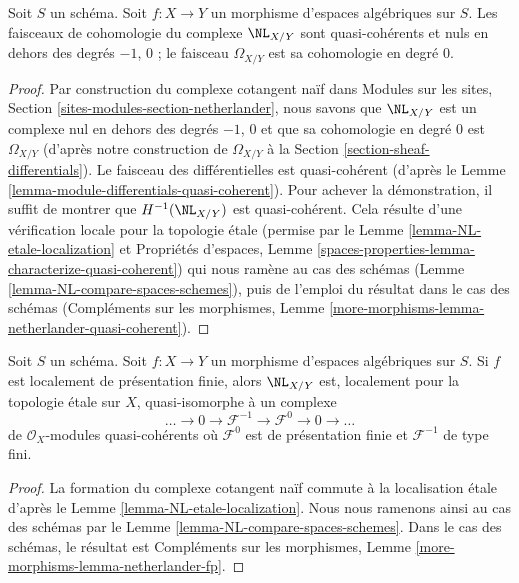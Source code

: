 \begin{lemma}
\label{lemma-netherlander-quasi-coherent}
Soit $S$ un schéma. Soit $f : X \to Y$ un morphisme
d'espaces algébriques sur $S$. Les faisceaux de cohomologie
du complexe $\NL_{X/Y}$ sont quasi-cohérents et nuls en dehors
des degrés $-1$, $0$ ; le faisceau $\Omega_{X/Y}$ est sa cohomologie en degré $0$.
\end{lemma}

\begin{proof}
Par construction du complexe cotangent naïf dans
Modules sur les sites, Section \ref{sites-modules-section-netherlander},
nous savons que $\NL_{X/Y}$ est un complexe nul en dehors des degrés $-1$, $0$
et que sa cohomologie en degré $0$ est $\Omega_{X/Y}$ (d'après notre
construction de $\Omega_{X/Y}$ à la Section \ref{section-sheaf-differentials}).
Le faisceau des différentielles est quasi-cohérent (d'après le
Lemme \ref{lemma-module-differentials-quasi-coherent}).
Pour achever la démonstration, il suffit de montrer que $H^{-1}(\NL_{X/Y})$
est quasi-cohérent. Cela résulte d'une vérification locale pour la topologie étale
(permise par le Lemme \ref{lemma-NL-etale-localization} et
Propriétés d'espaces, Lemme
\ref{spaces-properties-lemma-characterize-quasi-coherent})
qui nous ramène au cas des schémas
(Lemme \ref{lemma-NL-compare-spaces-schemes}),
puis de l'emploi du résultat dans le cas des schémas
(Compléments sur les morphismes, Lemme
\ref{more-morphisms-lemma-netherlander-quasi-coherent}).
\end{proof}

\begin{lemma}
\label{lemma-netherlander-fp}
Soit $S$ un schéma.
Soit $f : X \to Y$ un morphisme d'espaces algébriques sur $S$.
Si $f$ est localement de
présentation finie, alors $\NL_{X/Y}$ est, localement pour la topologie étale sur $X$,
quasi-isomorphe à un complexe
$$
\ldots \to 0 \to \mathcal{F}^{-1} \to \mathcal{F}^0 \to 0 \to \ldots
$$
de $\mathcal{O}_X$-modules quasi-cohérents
où $\mathcal{F}^0$ est de présentation finie
et $\mathcal{F}^{-1}$ de type fini.
\end{lemma}

\begin{proof}
La formation du complexe cotangent naïf commute à la
localisation étale d'après le Lemme \ref{lemma-NL-etale-localization}.
Nous nous ramenons ainsi au cas des schémas par le
Lemme \ref{lemma-NL-compare-spaces-schemes}.
Dans le cas des schémas, le résultat est
Compléments sur les morphismes, Lemme
\ref{more-morphisms-lemma-netherlander-fp}.
\end{proof}

